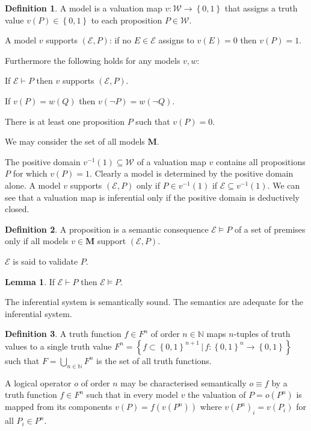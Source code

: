 \documentclass{amsbook}
\newcommand{\setsm}[1]{\left\{#1\right\}}
\newcommand{\wffs}{\mathcal W}
\newcommand{\infers}{\mathrel\vdash}
\newcommand{\valids}{\mathrel\vDash}
\theoremstyle{definition}
\newtheorem{lmm}{Lemma}[section]
\newtheorem{dfn}{Definition}[section]
\begin{document}
\begin{dfn}
    A model is a valuation map $v: \wffs \longrightarrow \setsm{0,1}$ that assigns a truth value $v(P) \in \setsm{0,1}$ to each proposition $P \in \wffs$.

    A model $v$ supports $(\mathcal E, P)$: if no $E \in \mathcal E$ assigns to $v(E) = 0$ then $v(P) = 1$.

    Furthermore the following holds for any models $v, w$:
    \begin{description}[
            labelindent=\parindent,
            before={
                    \renewcommand\makelabel[1]{(##1).}
                }
        ]
        \item [inferential] If $\mathcal E \infers P$ then $v$ supports $(\mathcal E, P)$.
        \item [regular with respect to negation] If $v(P) = w(Q)$ then $v(\neg P) = w(\neg Q)$.
        \item [not trivial] There is at least one proposition $P$ such that $v(P) = 0$.
    \end{description}
    We may consider the set of all models $\mathbf M$.
\end{dfn}

The positive domain $v^{-1}(1) \subseteq \wffs$ of a valuation map $v$ contains all propositions $P$ for which $v(P) = 1$. Clearly a model is determined by the positive domain alone. A model $v$ supports $(\mathcal E, P)$ only if $P \in v^{-1}(1)$ if $\mathcal E \subseteq v^{-1}(1)$. We can see that a valuation map is inferential only if the positive domain is deductively closed.

\begin{dfn}
    A proposition is a semantic consequence $\mathcal E \valids P$ of a set of premises only if all models $v \in \mathbf M$ support $(\mathcal E, P)$.

    $\mathcal E$ is said to validate $P$.
\end{dfn}

\begin{lmm}
    If $\mathcal E \infers P$ then $\mathcal E \valids P$.

    The inferential system is semantically sound. The semantics are adequate for the inferential system.
\end{lmm}

\begin{dfn}
    A truth function $f \in F^n$ of order $n \in \mathbb N$ maps $n$-tuples of truth values to a single truth value $F^n = \left\{ f \subset \setsm{0,1}^{n+1} \,\bigg|\, f: \setsm{0,1}^n \longrightarrow \setsm{0,1} \right\}$ such that $F = \bigcup_{n \in \mathbb N} F^n$ is the set of all truth functions.

    A logical operator $o$ of order $n$ may be characterised semantically $o \equiv f$ by a truth function $f \in F^n$ such that in every model $v$ the valuation of $P = o(P^n)$ is mapped from its components $v(P) = f(v(P^n))$ where $v(P^n)_i = v(P_i)$ for all $P_i \in P^n$.
\end{dfn}
\end{document}
